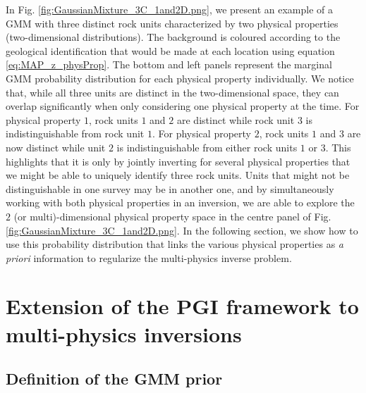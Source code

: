 \documentclass[extra, mreferee]{gji_joint} %
\begin{document}
In Fig. \ref{fig:GaussianMixture_3C_1and2D.png}, we present an example of a GMM with three distinct rock units characterized by two physical properties (two-dimensional distributions). The background is coloured according to the geological identification that would be made at each location using equation \eqref{eq:MAP_z_physProp}. The bottom and left panels represent the marginal GMM probability distribution for each physical property individually. We notice that, while all three units are distinct in the two-dimensional space, they can overlap significantly when only considering one physical property at the time. For physical property $1$, rock units $1$ and $2$ are distinct while rock unit $3$ is indistinguishable from rock unit $1$. For physical property $2$, rock units $1$ and $3$ are now distinct while unit $2$ is indistinguishable from either rock units $1$ or $3$. This highlights that it is only by jointly inverting for several physical properties that we might be able to uniquely identify three rock units. Units that might not be distinguishable in one survey may be in another one, and by simultaneously working with both physical properties in an inversion, we are able to explore the $2$ (or multi)-dimensional physical property space in the centre panel of Fig. \ref{fig:GaussianMixture_3C_1and2D.png}. In the following section, we show how to use this probability distribution that links the various physical properties as \textit{a priori} information to regularize the multi-physics inverse problem.

\section{Extension of the PGI framework to multi-physics inversions}

\subsection{Definition of the GMM prior} \label{section:GMMprior}
\end{document}
